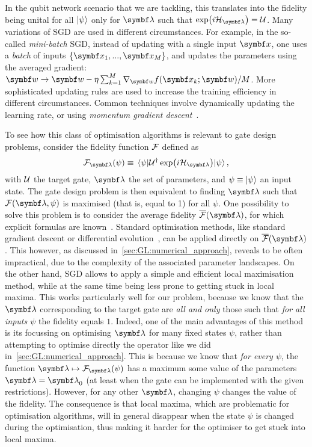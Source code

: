 In the qubit network scenario that we are tackling, this translates into the fidelity being unital for all $\ket\psi$ only for $\bslambda$ such that $\exp(i\calH_\bslambda)=\calU$.
Many variations of \ac{SGD} are used in different circumstances.
For example, in the so-called \emph{mini-batch} \ac{SGD}, instead of updating with a single input $\bs x$, one uses a \emph{batch} of inputs $\{\bs x_1,...,\bs x_M\}$, and updates the parameters using the averaged gradient:
$\bs w\to\bs w-\eta\sum_{k=1}^M\grad_{\bs w}f(\bs x_k; \bs w)/M$.
More sophisticated updating rules are used to increase the training efficiency in different circumstances.
Common techniques involve dynamically updating the learning rate, or using \emph{momentum gradient descent}~\cite{goh2017momentum,ruder2016overview}.

To see how this class of optimisation algorithms is relevant to gate design problems, consider the fidelity function ${\mathcal{F}}$ defined as
\begin{equation}
	\calF_\bslambda(\psi) \equiv \mel{\psi}{\calU^\dagger \exp(i \calH_\bslambda)}{\psi},
	\label{eq:GL:def_fidelity}
\end{equation}
with ${\mathcal{U}}$ the target gate, $\bslambda$ the set of parameters, and $\psi\equiv\ket\psi$ an input state.
The gate design problem is then equivalent to finding $\bslambda$ such that $\calF(\bslambda, \psi)$ is maximised (that is, equal to 1) for all $\psi$.
One possibility to solve this problem is to consider the average fidelity $\barcalF(\bslambda)$, for which explicit formulas are known~\cite{banchi2011nonperturbative,pedersen2007fidelity,magesan2011gate}.
Standard optimisation methods, like standard gradient descent or differential evolution~\cite{chakraborty2008advances}, can be applied directly on $\barcalF(\bslambda)$.
This however, as discussed in~\cref{sec:GL:numerical_approach}, reveals to be often impractical, due to the complexity of the associated parameter landscapes.
On the other hand, \ac{SGD} allows to apply a simple and efficient local maximisation method, while at the same time being less prone to getting stuck in local maxima.
This works particularly well for our problem, because we know that the $\bslambda$ corresponding to the target gate are \emph{all and only} those such that \emph{for all inputs $\psi$} the fidelity equals $1$.
Indeed, one of the main advantages of this method is its focussing on optimising $\bslambda$ for many fixed states $\psi$, rather than attempting to optimise directly the operator like we did in~\cref{sec:GL:numerical_approach}.
This is because we know that \emph{for every $\psi$}, the function $\bslambda\mapsto \calF_\bslambda(\psi)$ has a maximum some value of the parameters $\bslambda=\bslambda_0$ (at least when the gate can be implemented with the given restrictions). However, for any other $\bslambda$, changing $\psi$ changes the value of the fidelity. The consequence is that local maxima, which are problematic for optimisation algorithms, will in general disappear when the state $\psi$ is changed during the optimisation, thus making it harder for the optimiser to get stuck into local maxima.

